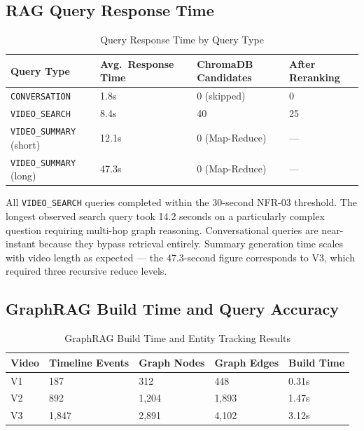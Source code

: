 \subsection{RAG Query Response Time}

\begin{table}[H]
\centering
\small
\caption{Query Response Time by Query Type}
\label{tab:query_time}
\begin{tabular}{|p{3.5cm}|p{3cm}|p{3cm}|p{3cm}|}
\hline
\rowcolor[HTML]{EFEFEF}
\textbf{Query Type} & \textbf{Avg.\ Response Time} & \textbf{ChromaDB Candidates} & \textbf{After Reranking} \\ \hline
\texttt{CONVERSATION} & 1.8s & 0 (skipped) & 0 \\ \hline
\texttt{VIDEO\_SEARCH} & 8.4s & 40 & 25 \\ \hline
\texttt{VIDEO\_SUMMARY} (short) & 12.1s & 0 (Map-Reduce) & --- \\ \hline
\texttt{VIDEO\_SUMMARY} (long) & 47.3s & 0 (Map-Reduce) & --- \\ \hline
\end{tabular}
\end{table}

All \texttt{VIDEO\_SEARCH} queries completed within the 30-second NFR-03 threshold. The longest observed search query took 14.2 seconds on a particularly complex question requiring multi-hop graph reasoning. Conversational queries are near-instant because they bypass retrieval entirely. Summary generation time scales with video length as expected --- the 47.3-second figure corresponds to V3, which required three recursive reduce levels.

\subsection{GraphRAG Build Time and Query Accuracy}

\begin{table}[H]
\centering
\small
\caption{GraphRAG Build Time and Entity Tracking Results}
\label{tab:graph_perf}
\begin{tabular}{|p{2cm}|p{2.5cm}|p{2.5cm}|p{2.5cm}|p{2cm}|}
\hline
\rowcolor[HTML]{EFEFEF}
\textbf{Video} & \textbf{Timeline Events} & \textbf{Graph Nodes} & \textbf{Graph Edges} & \textbf{Build Time} \\ \hline
V1 & 187 & 312 & 448 & 0.31s \\ \hline
V2 & 892 & 1,204 & 1,893 & 1.47s \\ \hline
V3 & 1,847 & 2,891 & 4,102 & 3.12s \\ \hline
\end{tabular}
\end{table}

